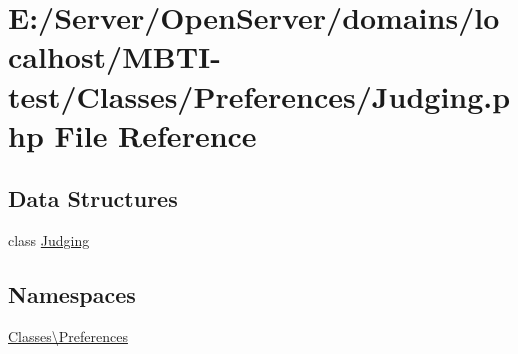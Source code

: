 \hypertarget{_judging_8php}{}\section{E\+:/\+Server/\+Open\+Server/domains/localhost/\+M\+B\+T\+I-\/test/\+Classes/\+Preferences/\+Judging.php File Reference}
\label{_judging_8php}
\subsection*{Data Structures}
\begin{DoxyCompactItemize}
\item 
class \hyperlink{class_classes_1_1_preferences_1_1_judging}{Judging}
\end{DoxyCompactItemize}
\subsection*{Namespaces}
\begin{DoxyCompactItemize}
\item 
 \hyperlink{namespace_classes_1_1_preferences}{Classes\textbackslash{}\+Preferences}
\end{DoxyCompactItemize}
